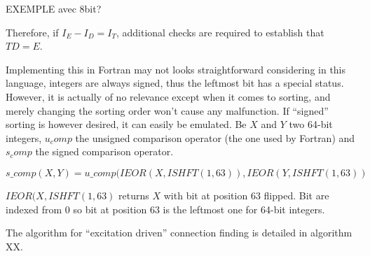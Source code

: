 EXEMPLE avec 8bit?

Therefore, if $I_E - I_D = I_T$, additional checks are required to establish that $TD = E$.


Implementing this in Fortran may not looks straightforward considering in this language, integers are always signed, thus the leftmost bit has a special status. However, it is actually of no relevance except when it comes to sorting, and merely changing the sorting order won't cause any malfunction.
If ``signed'' sorting is however desired, it can easily be emulated. Be $X$ and $Y$ two 64-bit integers, $u_comp$ the unsigned comparison operator (the one used by Fortran) and $s_comp$ the signed comparison operator.

\begin{equation}
s\_comp(X,Y) = u\_comp(IEOR(X,ISHFT(1,63)), IEOR(Y,ISHFT(1,63))
\end{equation}


$IEOR(X,ISHFT(1,63)$ returns $X$ with bit at position 63 flipped. Bit are indexed from 0 so bit at position 63 is the leftmost one for 64-bit integers.

The algorithm for ``excitation driven'' connection finding is detailed in algorithm XX.


